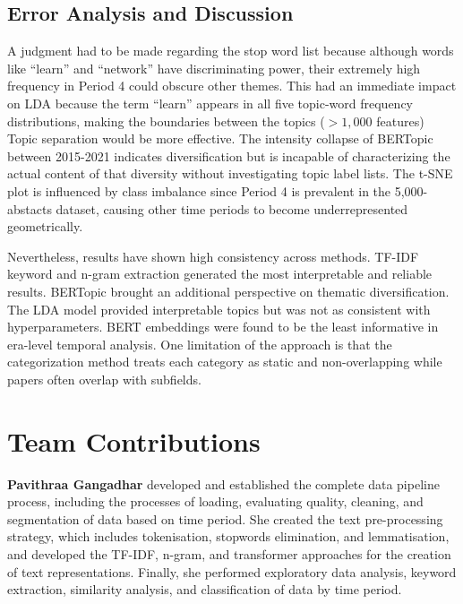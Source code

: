 \documentclass{article}
\begin{document}
\subsection{Error Analysis and Discussion}

A judgment had to be made regarding the stop word list because although
words like ``learn'' and ``network'' have discriminating power, their extremely
high frequency in Period 4 could obscure other themes. This had an immediate
impact on LDA because the term ``learn'' appears in all five topic-word
frequency distributions, making the boundaries between the topics
($>1{,}000$ features) Topic separation would be more effective.
The intensity collapse of BERTopic between 2015-2021 indicates
diversification but is incapable of characterizing the actual
content of that diversity without investigating topic label
lists. The t-SNE plot is influenced by class imbalance since
Period 4 is prevalent in the 5,000-abstacts dataset, causing
other time periods to become underrepresented geometrically.

Nevertheless, results have shown high consistency across methods.
TF-IDF keyword and n-gram extraction generated the most
interpretable and reliable results. BERTopic brought an additional
perspective on thematic diversification. The LDA model provided
interpretable topics but was not as consistent with hyperparameters.
BERT embeddings were found to be the least informative in era-level
temporal analysis. One limitation of the approach is that the
categorization method treats each category as static and
non-overlapping while papers often overlap with subfields.


\section{Team Contributions}
\label{sec:contributions}

\textbf{Pavithraa Gangadhar} developed and established
the complete data pipeline process, including the
processes of loading, evaluating quality, cleaning, and
segmentation of data based on time period. She created the
text pre-processing strategy, which includes tokenisation,
stopwords elimination, and lemmatisation, and developed the
TF-IDF, n-gram, and transformer approaches for the creation
of text representations. Finally, she performed exploratory
data analysis, keyword extraction, similarity analysis, and
classification of data by time period.
\end{document}
